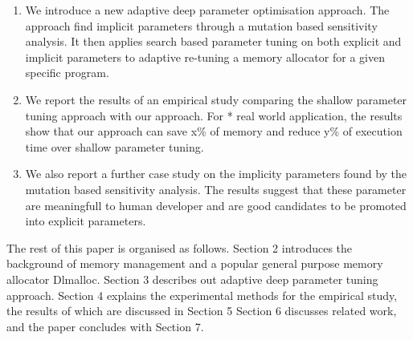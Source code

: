 \begin{enumerate}

\item We introduce a new adaptive deep parameter optimisation approach. The approach find implicit parameters through a mutation based sensitivity analysis. It then applies search based parameter tuning on both explicit and implicit parameters to adaptive re-tuning a memory allocator for a given specific program.

\item We report the results of an empirical study comparing the shallow parameter tuning approach with our approach. For * real world application, the results show that our approach can save x\% of memory and reduce y\% of execution time over shallow parameter tuning. 

\item We also report a further case study on the implicity parameters found by the mutation based sensitivity analysis. The results suggest that these parameter are meaningfull to human developer and are good candidates to be promoted into explicit parameters. 
\end{enumerate}

The rest of this paper is organised as follows. 
Section 2 introduces the background of memory management and a popular general purpose memory allocator Dlmalloc.
Section 3 describes out adaptive deep parameter tuning approach.
Section 4 explains the experimental methods for the empirical study, the results of which are discussed in Section 5
Section 6 discusses related work, and the paper concludes with Section 7.


